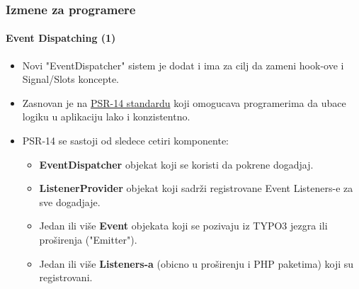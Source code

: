 \begin{frame}[fragile]
	\frametitle{Izmene za programere}
	\framesubtitle{Event Dispatching (1)}

	\begin{itemize}
		\item Novi "EventDispatcher" sistem je dodat i ima za cilj da zameni hook-ove i Signal/Slots koncepte.

		\item Zasnovan je na \href{https://www.php-fig.org/psr/psr-14}{PSR-14 standardu}
			koji omogucava programerima da ubace logiku u aplikaciju lako i konzistentno.

		\item PSR-14 se sastoji od sledece cetiri komponente:

			\begin{itemize}
				\item \textbf{EventDispatcher} objekat koji se koristi da pokrene dogadjaj.
				\item \textbf{ListenerProvider} objekat koji sadrži registrovane Event Listeners-e za sve dogadjaje.
				\item Jedan ili više \textbf{Event} objekata koji se pozivaju iz TYPO3 jezgra ili proširenja ("Emitter").
				\item Jedan ili više \textbf{Listeners-a} (obicno u proširenju i PHP paketima) koji su registrovani.
			\end{itemize}


	\end{itemize}

\end{frame}



